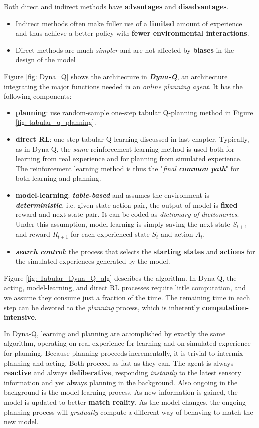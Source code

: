 \documentclass[11pt]{article}
\begin{document}
Both direct and indirect methods have \textbf{advantages} and \textbf{disadvantages}. 
\begin{itemize}
\item Indirect methods often make fuller use of a \textbf{limited} amount of experience and thus achieve a better policy with \textbf{fewer environmental interactions}. 

\item Direct methods are much \emph{simpler} and are not affected by \textbf{biases} in the design of the model
\end{itemize} Figure \ref{fig: Dyna_Q} shows the architecture in \textbf{\emph{Dyna-Q}},  an architecture integrating the major functions needed in an \emph{online planning agent}.  It has the following components:
\begin{itemize}
\item \textbf{planning}:  use  random-sample one-step tabular Q-planning method in Figure \ref{fig: tabular_q_planning}. 
\item \textbf{direct RL}:  one-step tabular Q-learning discussed in last chapter. Typically, as in Dyna-Q, the \emph{same} reinforcement learning method is used both for learning from real experience and for planning from simulated experience. The reinforcement learning method is thus the "\emph{final \textbf{common path}}" for both learning and planning.
\item \textbf{model-learning}: \textbf{\emph{table-based}} and assumes the environment is \textbf{\emph{deterministic}}, i.e. given state-action pair, the output of model is \textbf{fixed} reward and next-state pair. It can be coded as \emph{dictionary of dictionaries}. Under this assumption, model learning is simply saving the next state $S_{t+1}$ and reward $R_{t+1}$ for each experienced state $S_{t}$ and action $A_{t}$.
\item \textbf{\emph{search control}}:  the process that selects the \textbf{starting states} and \textbf{actions} for the simulated experiences generated by the model. 

\end{itemize} Figure \ref{fig: Tabular_Dyna_Q_alg} describes the algorithm.  In Dyna-Q, the acting, model-learning, and direct RL processes require little computation, and we assume they consume just a fraction of the time. The remaining time in each step can be devoted to the \emph{planning} process, which is inherently \textbf{computation-intensive}.

In Dyna-Q, learning and planning are accomplished by exactly the same algorithm, operating on real experience for learning and on simulated experience for planning.
Because planning proceeds incrementally, it is trivial to intermix planning and acting. Both proceed as fast as they can. The agent is always \textbf{reactive} and always \textbf{deliberative}, responding \emph{instantly} to the latest sensory information and yet always planning in the background. Also ongoing in the background is the model-learning process. As new information is gained, the model is updated to better \textbf{match reality}. As the model changes, the ongoing planning process will \emph{gradually} compute a different way of behaving to match the new model.
\end{document}
